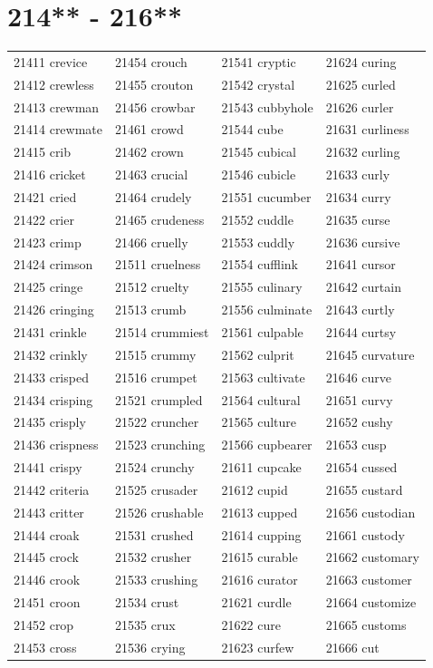 \documentclass[10pt, oneside]{book}
\begin{document}
\begin{table}
	\centering
	\section*{214** - 216**}
	\begin{tabular}{l l l l}
21411 crevice &21454 crouch &21541 cryptic &21624 curing\\
21412 crewless &21455 crouton &21542 crystal &21625 curled\\
21413 crewman &21456 crowbar &21543 cubbyhole &21626 curler\\
21414 crewmate &21461 crowd &21544 cube &21631 curliness\\
21415 crib &21462 crown &21545 cubical &21632 curling\\
21416 cricket &21463 crucial &21546 cubicle &21633 curly\\
21421 cried &21464 crudely &21551 cucumber &21634 curry\\
21422 crier &21465 crudeness &21552 cuddle &21635 curse\\
21423 crimp &21466 cruelly &21553 cuddly &21636 cursive\\
21424 crimson &21511 cruelness &21554 cufflink &21641 cursor\\
21425 cringe &21512 cruelty &21555 culinary &21642 curtain\\
21426 cringing &21513 crumb &21556 culminate &21643 curtly\\
21431 crinkle &21514 crummiest &21561 culpable &21644 curtsy\\
21432 crinkly &21515 crummy &21562 culprit &21645 curvature\\
21433 crisped &21516 crumpet &21563 cultivate &21646 curve\\
21434 crisping &21521 crumpled &21564 cultural &21651 curvy\\
21435 crisply &21522 cruncher &21565 culture &21652 cushy\\
21436 crispness &21523 crunching &21566 cupbearer &21653 cusp\\
21441 crispy &21524 crunchy &21611 cupcake &21654 cussed\\
21442 criteria &21525 crusader &21612 cupid &21655 custard\\
21443 critter &21526 crushable &21613 cupped &21656 custodian\\
21444 croak &21531 crushed &21614 cupping &21661 custody\\
21445 crock &21532 crusher &21615 curable &21662 customary\\
21446 crook &21533 crushing &21616 curator &21663 customer\\
21451 croon &21534 crust &21621 curdle &21664 customize\\
21452 crop &21535 crux &21622 cure &21665 customs\\
21453 cross &21536 crying &21623 curfew &21666 cut\\
	\end{tabular}
 \end{table}
\clearpage
\end{document}
